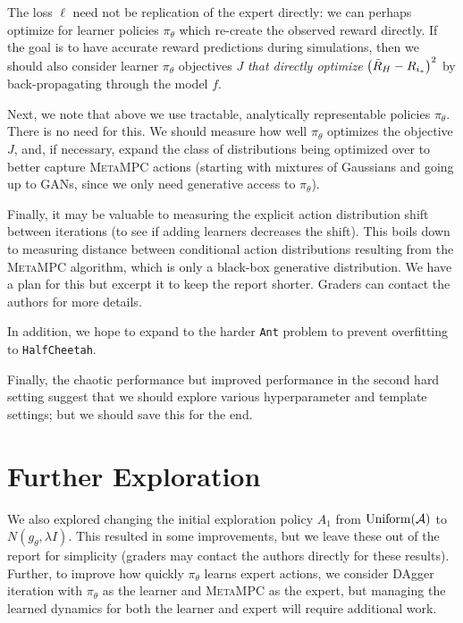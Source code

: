 \documentclass{article}
\begin{document}
The loss $\ell$ need not be replication of the expert directly: we can perhaps optimize for learner policies $\pi_\theta$ which re-create the observed reward directly. If the goal is to have accurate reward predictions during simulations, then we should also consider learner $\pi_\theta$ objectives $J$ \textit{that directly optimize} $\left({\tilde{R}_H-R_{i_*}}\right)^2$ by back-propagating through the model $f$. 

Next, we note that above we use tractable, analytically representable policies $\pi_\theta$. There is no need for this. We should measure how well $\pi_\theta$ optimizes the objective $J$, and, if necessary, expand the class of distributions being optimized over to better capture \textsc{MetaMPC} actions (starting with mixtures of Gaussians and going up to GANs, since we only need generative access to $\pi_\theta$).

Finally, it may be valuable to measuring the explicit action distribution shift between iterations (to see if adding learners decreases the shift). This boils down to measuring distance between conditional action distributions resulting from the \textsc{MetaMPC} algorithm, which is only a black-box generative distribution. We have a plan for this but excerpt it to keep the report shorter. Graders can contact the authors for more details.

In addition, we hope to expand to the harder \texttt{Ant} problem to prevent overfitting to \texttt{HalfCheetah}.

Finally, the chaotic performance but improved performance in the second hard setting suggest that we should explore various hyperparameter and template settings; but we should save this for the end.

\section{Further Exploration}

We also explored changing the initial exploration policy $A_1$ from $\operatorname{Uniform}(\mathcal{A})$ to $N(g_\theta, \lambda I)$. This resulted in some improvements, but we leave these out of the report for simplicity (graders may contact the authors directly for these results). Further, to improve how quickly $\pi_\theta$ learns expert actions, we consider DAgger iteration with $\pi_\theta$ as the learner and \textsc{MetaMPC} as the expert, but managing the learned dynamics for both the learner and expert will require additional work.
\end{document}
